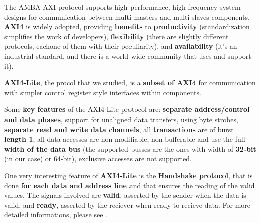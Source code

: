{}

The AMBA AXI protocol supports high-performance, high-frequency system designs for communication between
multi masters and multi slaves components.
{\bf AXI4} is widely adopted, providing {\bf benefits} to {\bf productivity} (standardization simplifies the work of developers), {\bf flexibility} (there are slightly different protocols, eachone of them with their peculiarity), and {\bf availability} (it's an industrial standard, and there is a world wide community that uses and support it).
\newline

{\bf AXI4-Lite}, the procol that we studied, is a {\bf subset of AXI4} for communication with simpler control register style interfaces within components.
\newline

Some {\bf key features} of the AXI4-Lite protocol are: {\bf separate address/control and data phases}, support for unaligned data transfers, using byte strobes, {\bf separate read and write data channels}, all {\bf transactions} are of burst {\bf length 1}, all data accesses are non-modifiable, non-bufferable and use the full {\bf width of the data bus} (the supported busses are the ones with width of {\bf 32-bit} (in our case) or 64-bit), exclusive accesses are not supported.
\newline

One very interesting feature of {\bf AXI4-Lite} is the {\bf Handshake protocol}, that is done {\bf for each data and address line} and that ensures the reading of the valid values. The signals involved are {\bf valid}, asserted by the sender when the data is valid, and {\bf ready}, asserted by the reciever when ready to recieve data. For more detailed informations, please see \cite[Section-A3.2.1]{AXISpecification}.

